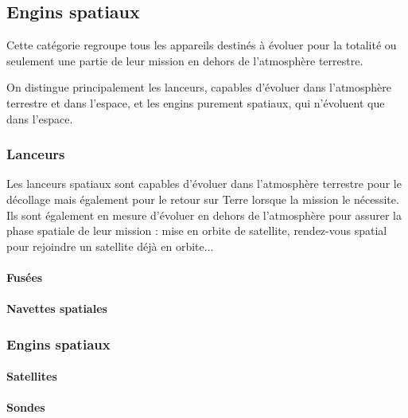 \begin{minipage}[c]{1.0\linewidth}
\begin{figure}[H]
\begin{minipage}[c]{0.5\linewidth}
	\end{minipage}
	\end{figure}
	\end{minipage}
	
	
\subsection{Engins spatiaux}
	Cette catégorie regroupe tous les appareils destinés à évoluer pour la totalité ou seulement une partie de leur mission en dehors de l'atmosphère terrestre.
	
	On distingue principalement les lanceurs, capables d'évoluer dans l'atmosphère terrestre et dans l'espace, et les engins purement spatiaux, qui n'évoluent que dans l'espace.

	\subsubsection{Lanceurs}
	Les lanceurs spatiaux sont capables d'évoluer dans l'atmosphère terrestre pour le décollage mais également pour le retour sur Terre lorsque la mission le nécessite. Ils sont également en mesure d'évoluer en dehors de l'atmosphère pour assurer la phase spatiale de leur mission : mise en orbite de satellite, rendez-vous spatial pour rejoindre un satellite déjà en orbite...
	
		\paragraph{Fusées}
		\paragraph{Navettes spatiales}
		
	\subsubsection{Engins spatiaux}
		\paragraph{Satellites}
		\paragraph{Sondes}

